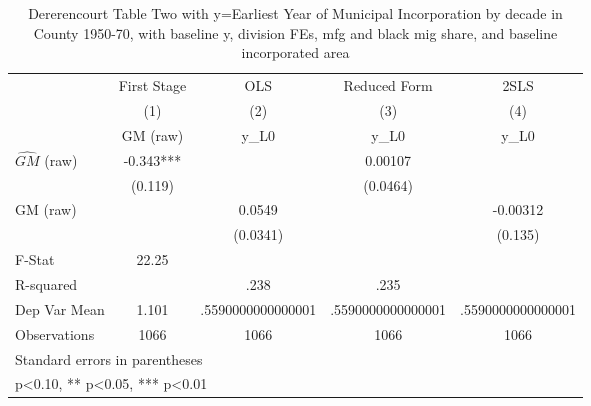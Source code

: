 \begin{table}[htbp]\centering
\def\sym#1{\ifmmode^{#1}\else\(^{#1}\)\fi}
\caption{Dererencourt Table Two with y=Earliest Year of Municipal Incorporation by decade in County 1950-70, with baseline y, division FEs, mfg and black mig share, and baseline incorporated area}
\begin{tabular}{l*{4}{c}}
\toprule
                    & First Stage   &         OLS   &Reduced Form   &        2SLS   \\
                    &\multicolumn{1}{c}{(1)}&\multicolumn{1}{c}{(2)}&\multicolumn{1}{c}{(3)}&\multicolumn{1}{c}{(4)}\\
                    &\multicolumn{1}{c}{GM  (raw)}&\multicolumn{1}{c}{y\_L0}&\multicolumn{1}{c}{y\_L0}&\multicolumn{1}{c}{y\_L0}\\
\midrule
$\hat{GM}$ (raw)    &      -0.343***&               &     0.00107   &               \\
                    &     (0.119)   &               &    (0.0464)   &               \\
\addlinespace
GM  (raw)           &               &      0.0549   &               &    -0.00312   \\
                    &               &    (0.0341)   &               &     (0.135)   \\
\midrule
F-Stat              &       22.25   &               &               &               \\
R-squared           &               &        .238   &        .235   &               \\
Dep Var Mean        &       1.101   &.5590000000000001   &.5590000000000001   &.5590000000000001   \\
Observations        &        1066   &        1066   &        1066   &        1066   \\
\bottomrule
\multicolumn{5}{l}{\footnotesize Standard errors in parentheses}\\
\multicolumn{5}{l}{\footnotesize * p<0.10, ** p<0.05, *** p<0.01}\\
\end{tabular}
\end{table}
